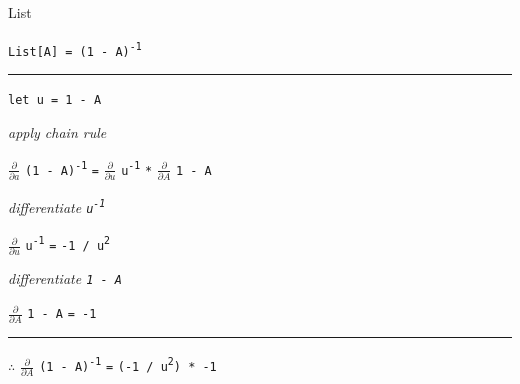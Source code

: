 \begin{frame}{List}

\lstinline{List[A] = (1 - A)}\textsuperscript{\lstinline{-1}}

\par\noindent\rule{\textwidth}{0.4pt}

\lstinline{let u = 1 - A}

\emph{\tiny{apply chain rule}}

$\frac{\partial}{\partial a}$ {\lstinline{(1 - A)}\textsuperscript{\lstinline{-1}}} \lstinline{=} $\frac{\partial}{\partial u}$ {\lstinline{u}\textsuperscript{\lstinline{-1}}} \lstinline{*} $\frac{\partial}{\partial A}$ \lstinline{1 - A}

\emph{\tiny{differentiate \lstinline{u}\textsuperscript{\lstinline{-1}}}}

$\frac{\partial}{\partial u}$ \lstinline{u}\textsuperscript{\lstinline{-1}} \lstinline{=} \lstinline{-1 / u}\textsuperscript{\lstinline{2}}

\emph{\tiny{differentiate \lstinline{1 - A}}}

$\frac{\partial}{\partial A}$ \lstinline{1 - A} \lstinline{= -1} 

\par\noindent\rule{\textwidth}{0.4pt}

{$\therefore$} $\frac{\partial}{\partial A}$ {\lstinline{(1 - A)}\textsuperscript{\lstinline{-1}}} \lstinline{=} \lstinline{(-1 / u}\textsuperscript{\lstinline{2}}\lstinline{) * -1}

\end{frame}


